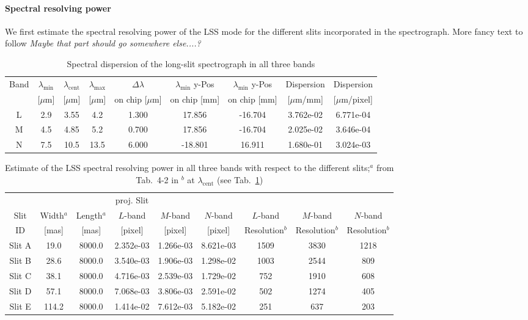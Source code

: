 \paragraph{Spectral resolving power}
We first estimate the spectral resolving power of the \ac{LSS} mode for the different slits incorporated in the spectrograph. More fancy text to follow \textit{Maybe that part should go somewhere else....?}\cite{METIS-system_analysis}
\begin{table}
\begin{center}
\begin{tabular}{c|cccc|cc|cc}
Band & $\lambda_\textrm{min}$ & $\lambda_\textrm{cent}$ & $\lambda_\textrm{max}$ & $\Delta\lambda$  & $\lambda_\textrm{min}$ y-Pos & $\lambda_\textrm{min}$ y-Pos & Dispersion & Dispersion \\
 & [$\mu$m] & [$\mu$m] & [$\mu$m]& on chip [$\mu$m] & on chip [mm] & on chip [mm] & [$\mu$m/mm] & [$\mu$m/pixel]\\
\hline
L & 2.9 & 3.55 & 4.2 & 1.300 & 17.856 & -16.704 & 3.762e-02 & 6.771e-04 \\
M & 4.5 & 4.85 & 5.2 & 0.700 & 17.856 & -16.704 & 2.025e-02 & 3.646e-04 \\
N & 7.5 & 10.5 & 13.5 & 6.000 & -18.801 & 16.911 & 1.680e-01 & 3.024e-03 \\
\end{tabular}
\caption{Spectral dispersion of the long-slit spectrograph in all three bands\label{tab:bands_specres1}}
\end{center}
\end{table}

\begin{table}
\begin{center}
\begin{tabular}{c|cc|ccc|ccc}
 & & & proj. Slit & & & & & \\
Slit & Width$^a$ & Length$^a$ & $L$-band & $M$-band & $N$-band & $L$-band & $M$-band & $N$-band \\
ID & [mas] & [mas] & [pixel] & [pixel] & [pixel] & Resolution$^b$ & Resolution$^b$ & Resolution$^b$ \\
\hline
Slit A & 19.0 & 8000.0 & 2.352e-03 & 1.266e-03 & 8.621e-03 & 1509 & 3830 & 1218 \\
Slit B & 28.6 & 8000.0 & 3.540e-03 & 1.906e-03 & 1.298e-02 & 1003 & 2544 & 809 \\
Slit C & 38.1 & 8000.0 & 4.716e-03 & 2.539e-03 & 1.729e-02 & 752 & 1910 & 608 \\
Slit D & 57.1 & 8000.0 & 7.068e-03 & 3.806e-03 & 2.591e-02 & 502 & 1274 & 405 \\
Slit E & 114.2 & 8000.0 & 1.414e-02 & 7.612e-03 & 5.182e-02 & 251 & 637 & 203 \\
\end{tabular}
\caption{Estimate of the LSS spectral resolving power in all three bands with respect to the different slits;\newline $^a$ from Tab.~4-2 in \cite{METIS-system_analysis} \newline $^b$ at $\lambda_\textrm{cent}$ (see Tab.~\ref{tab:bands_specres1})\label{tab:bands_specres2}}
\end{center}
\end{table}


